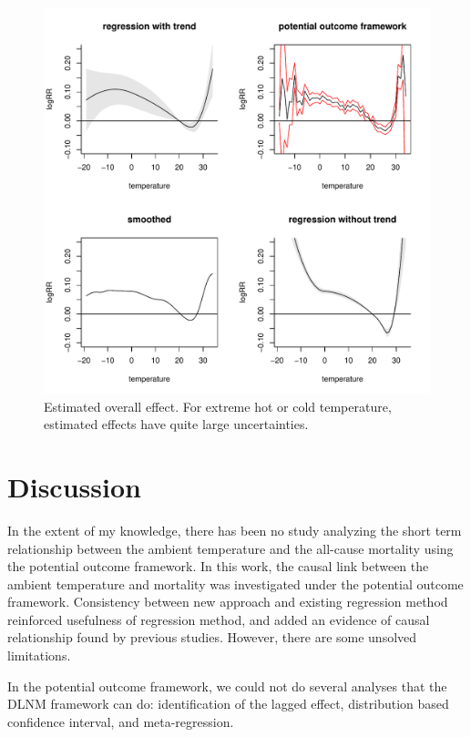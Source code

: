 \documentclass[12pt]{article}
\begin{document}
\begin{figure}
	\includegraphics[width = \textwidth]{figures/main1.pdf}
	\caption{Estimated overall effect. 
	For extreme hot or cold temperature, estimated effects have quite large uncertainties.}
	\label{figure:main}
\end{figure}

\section{Discussion}
\label{section:discussion}

In the extent of my knowledge, there has been no study analyzing the short term relationship 
between the ambient temperature and the all-cause mortality using the potential outcome framework.
In this work, the causal link between the ambient temperature and mortality 
was investigated under the potential outcome framework.
Consistency between new approach and existing regression method reinforced
usefulness of regression method, and added an evidence of causal relationship found by previous studies.
However, there are some unsolved limitations.

In the potential outcome framework, we could not do several analyses that the DLNM framework can do:
identification of the lagged effect, distribution based confidence interval, and meta-regression.
\end{document}
